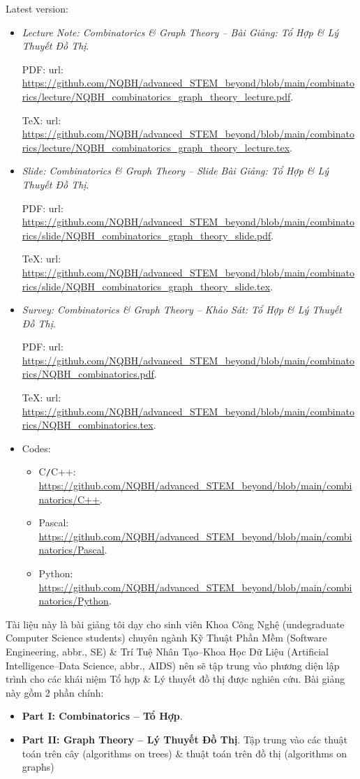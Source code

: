\documentclass[oneside]{book}
\begin{document}
Latest version:
\begin{itemize}
	\item {\it Lecture Note: Combinatorics \& Graph Theory -- Bài Giảng: Tổ Hợp \& Lý Thuyết Đồ Thị}.
	
	PDF: {\sc url}: \url{https://github.com/NQBH/advanced_STEM_beyond/blob/main/combinatorics/lecture/NQBH_combinatorics_graph_theory_lecture.pdf}.
	
	\TeX: {\sc url}: \url{https://github.com/NQBH/advanced_STEM_beyond/blob/main/combinatorics/lecture/NQBH_combinatorics_graph_theory_lecture.tex}.
	\item {\it Slide: Combinatorics \& Graph Theory -- Slide Bài Giảng: Tổ Hợp \& Lý Thuyết Đồ Thị}.
	
	PDF: {\sc url}: \url{https://github.com/NQBH/advanced_STEM_beyond/blob/main/combinatorics/slide/NQBH_combinatorics_graph_theory_slide.pdf}.
	
	\TeX: {\sc url}: \url{https://github.com/NQBH/advanced_STEM_beyond/blob/main/combinatorics/slide/NQBH_combinatorics_graph_theory_slide.tex}.
	\item {\it Survey: Combinatorics \& Graph Theory -- Khảo Sát: Tổ Hợp \& Lý Thuyết Đồ Thị}.
	
	PDF: {\sc url}: \url{https://github.com/NQBH/advanced_STEM_beyond/blob/main/combinatorics/NQBH_combinatorics.pdf}.
	
	\TeX: {\sc url}: \url{https://github.com/NQBH/advanced_STEM_beyond/blob/main/combinatorics/NQBH_combinatorics.tex}.
	\item Codes:
	\begin{itemize}
		\item C{\tt/}C++: \url{https://github.com/NQBH/advanced_STEM_beyond/blob/main/combinatorics/C++}.
		\item Pascal: \url{https://github.com/NQBH/advanced_STEM_beyond/blob/main/combinatorics/Pascal}.
		\item Python: \url{https://github.com/NQBH/advanced_STEM_beyond/blob/main/combinatorics/Python}.
	\end{itemize}
\end{itemize}
Tài liệu này là bài giảng tôi dạy cho sinh viên Khoa Công Nghệ (undegraduate Computer Science students) chuyên ngành Kỹ Thuật Phần Mềm (Software Engineering, abbr., SE) \& Trí Tuệ Nhân Tạo--Khoa Học Dữ Liệu (Artificial Intelligence--Data Science, abbr., AIDS) nên sẽ tập trung vào phương diện lập trình cho các khái niệm Tổ hợp \& Lý thuyết đồ thị được nghiên cứu. Bài giảng này gồm 2 phần chính:
\begin{itemize}
	\item {\bf Part I: Combinatorics -- Tổ Hợp}.
	\item {\bf Part II: Graph Theory -- Lý Thuyết Đồ Thị}. Tập trung vào các thuật toán trên cây (algorithms on trees) \& thuật toán trên đồ thị (algorithms on graphs)
\end{itemize}
\end{document}
